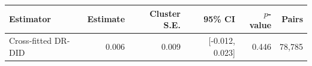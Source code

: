 \begin{tabular}{lrrrrr}
\toprule
Estimator & Estimate & Cluster S.E. & 95\% CI & $p$-value & Pairs \\
\midrule
Cross-fitted DR-DID & 0.006 & 0.009 & [-0.012, 0.023] & 0.446 & 78,785 \\
\bottomrule
\end{tabular}